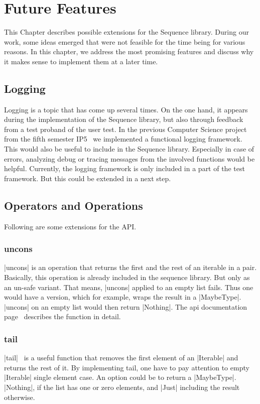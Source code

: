 \section{Future Features}
\label{sec:Future Features}
This Chapter describes possible extensions for the Sequence library. During our
work, some ideas emerged that were not feasible for the time being for various
reasons. In this chapter, we address the most promising features and discuss
why it makes sense to implement them at a later time.

\subsection{Logging}
\label{sub:Logging}
Logging is a topic that has come up several times. On the one hand, it appears
during the implementation of the Sequence library, but also through feedback
from a test proband of the user test. In the previous Computer Science project from the fifth
semester IP5~\cite{wild_ip5_2023} we implemented a functional logging framework. 
This would also be useful to include in the Sequence library. Especially in case of errors, analyzing
debug or tracing messages from the involved functions would be helpful. Currently, the logging
framework is only included in a part of the test framework. But this could be
extended in a next step.

\subsection{Operators and Operations}
\label{sub:Operators and Operations}
Following are some extensions for the API.

\subsubsection{uncons}
\label{subsub:uncons}
|uncons| is an operation that returns the first and the rest of an iterable in a
pair. Basically, this operation is already included in the sequence library.
But only as an un-safe variant. That means, |uncons| applied to an empty list
fails. Thus one would have a version, which for example, wraps the result in a
|MaybeType|. |uncons| on an empty list would then return |Nothing|. The
api documentation page~\cite{hoogle_uncons} describes the function in detail.

\subsubsection{tail}
\label{subsub:tail}
|tail|~\cite{hoogle_tail} is a useful function that removes the first element of an |Iterable|
and returns the rest of it. By implementing tail, one have to pay attention to
empty |Iterable| single element case. An option could be to return a
|MaybeType|. |Nothing|, if the list has one or zero elements, and
|Just| including the result otherwise.


